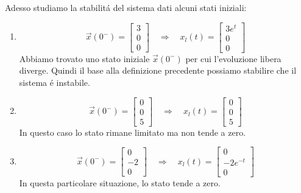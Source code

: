\documentclass[../main.tex]{subfiles}
\begin{document}
\begin{mdframed}[style=Esempio]
			Adesso studiamo la stabilit\'a del sistema dati alcuni stati iniziali:
			\begin{enumerate}
				\item
					\[
						\vec x(0^-) =
						\begin{bmatrix} 
							3\\ 
							0\\ 
							0
						\end{bmatrix} 
						\quad\Rightarrow\quad x_l(t) = 
						\begin{bmatrix} 
							3e^t\\ 
							0\\ 
							0
						\end{bmatrix}
					\]
					Abbiamo trovato uno stato iniziale $ \vec x(0^-) $ per cui l'evoluzione libera diverge. Quindi il base alla definizione precedente possiamo stabilire che il sistema \'e instabile.
				\item
					\[
						\vec x(0^-) = 
						\begin{bmatrix} 
							0\\ 
							0\\ 
							5
						\end{bmatrix} 
						\quad\Rightarrow\quad x_l(t) = 
						\begin{bmatrix} 
							0\\ 
							0\\ 
							5
						\end{bmatrix}
					\]
					In questo caso lo stato rimane limitato ma non tende a zero.
				\item
					\[
						\vec x(0^-) = 
						\begin{bmatrix} 
							0\\ 
							-2\\ 
							0 
						\end{bmatrix} 
						\quad\Rightarrow\quad 
						x_l(t) = 
						\begin{bmatrix} 
							0\\
							-2e^{-t}\\
							0
						\end{bmatrix}
					\]
					In questa particolare situazione, lo stato tende a zero.                
			\end{enumerate}                                                           
		\end{mdframed}
                                                           
\end{document}
